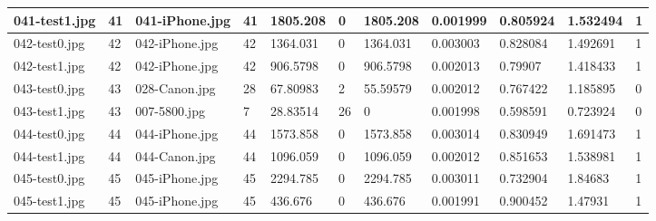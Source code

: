 \begin{landscape}
\begin{longtable}{|p{2cm}|p{1cm}|p{2cm}|p{1cm}|p{2cm}|p{1cm}|p{2cm}|p{2cm}|p{2cm}|p{2cm}|p{1cm}|}
		041-test1.jpg   & 41               & 041-iPhone.jpg        & 41                          & 1805.208              & 0                       & 1805.208                   & 0.001999              & 0.805924              & 1.532494                 & 1                \\ \hline
		042-test0.jpg   & 42               & 042-iPhone.jpg        & 42                          & 1364.031              & 0                       & 1364.031                   & 0.003003              & 0.828084              & 1.492691                 & 1                \\ \hline
		042-test1.jpg   & 42               & 042-iPhone.jpg        & 42                          & 906.5798              & 0                       & 906.5798                   & 0.002013              & 0.79907               & 1.418433                 & 1                \\ \hline
		043-test0.jpg   & 43               & 028-Canon.jpg         & 28                          & 67.80983              & 2                       & 55.59579                   & 0.002012              & 0.767422              & 1.185895                 & 0                \\ \hline
		043-test1.jpg   & 43               & 007-5800.jpg          & 7                           & 28.83514              & 26                      & 0                          & 0.001998              & 0.598591              & 0.723924                 & 0                \\ \hline
		044-test0.jpg   & 44               & 044-iPhone.jpg        & 44                          & 1573.858              & 0                       & 1573.858                   & 0.003014              & 0.830949              & 1.691473                 & 1                \\ \hline
		044-test1.jpg   & 44               & 044-Canon.jpg         & 44                          & 1096.059              & 0                       & 1096.059                   & 0.002012              & 0.851653              & 1.538981                 & 1                \\ \hline
		045-test0.jpg   & 45               & 045-iPhone.jpg        & 45                          & 2294.785              & 0                       & 2294.785                   & 0.003011              & 0.732904              & 1.84683                  & 1                \\ \hline
		045-test1.jpg   & 45               & 045-iPhone.jpg        & 45                          & 436.676               & 0                       & 436.676                    & 0.001991              & 0.900452              & 1.47931                  & 1                \\ \hline

\end{longtable}
\end{landscape}
